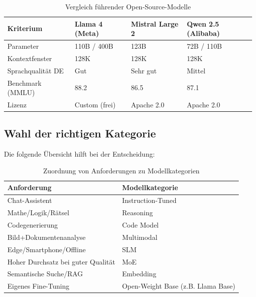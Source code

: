\begin{table}[H]
\centering
\begin{tabularx}{\linewidth}{lXXX}
\toprule
\textbf{Kriterium} & \textbf{Llama 4 (Meta)} & \textbf{Mistral Large 2} & \textbf{Qwen 2.5 (Alibaba)} \\
\midrule
Parameter & 110B / 400B & 123B & 72B / 110B \\
Kontextfenster & 128K & 128K & 128K \\
Sprachqualität DE & Gut & Sehr gut & Mittel \\
Benchmark (MMLU) & 88.2 & 86.5 & 87.1 \\
Lizenz & Custom (frei) & Apache 2.0 & Apache 2.0 \\
\bottomrule
\end{tabularx}
\caption{Vergleich führender Open-Source-Modelle}
\label{tab:oss-modelle}
\end{table}

\subsection{Wahl der richtigen Kategorie}

Die folgende Übersicht hilft bei der Entscheidung:

\begin{table}[H]
\centering
\begin{tabularx}{\linewidth}{lX}
\toprule
\textbf{Anforderung} & \textbf{Modellkategorie} \\
\midrule
Chat-Assistent & Instruction-Tuned \\
Mathe/Logik/Rätsel & Reasoning \\
Codegenerierung & Code Model \\
Bild+Dokumentenanalyse & Multimodal \\
Edge/Smartphone/Offline & SLM \\
Hoher Durchsatz bei guter Qualität & MoE \\
Semantische Suche/RAG & Embedding \\
Eigenes Fine-Tuning & Open-Weight Base (z.B. Llama Base) \\
\bottomrule
\end{tabularx}
\caption{Zuordnung von Anforderungen zu Modellkategorien}
\label{tab:model-choice-typology}
\end{table}



